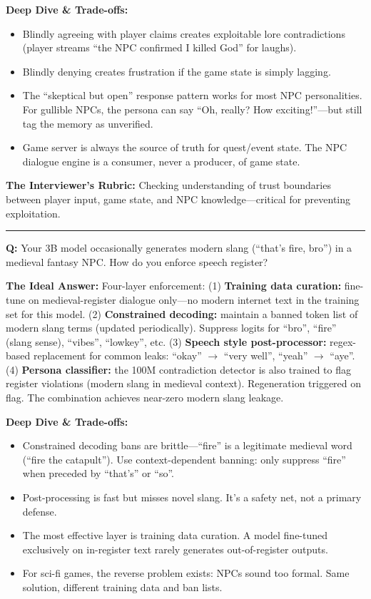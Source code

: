 \textbf{Deep Dive \& Trade-offs:}
\begin{itemize}
  \item Blindly agreeing with player claims creates exploitable lore contradictions (player streams ``the NPC confirmed I killed God'' for laughs).
  \item Blindly denying creates frustration if the game state is simply lagging.
  \item The ``skeptical but open'' response pattern works for most NPC personalities. For gullible NPCs, the persona can say ``Oh, really? How exciting!''---but still tag the memory as unverified.
  \item Game server is always the source of truth for quest/event state. The NPC dialogue engine is a consumer, never a producer, of game state.
\end{itemize}

\textbf{The Interviewer's Rubric:} Checking understanding of trust boundaries between player input, game state, and NPC knowledge---critical for preventing exploitation.

\bigskip\hrule\bigskip

\textbf{Q:} Your 3B model occasionally generates modern slang (``that's fire, bro'') in a medieval fantasy NPC. How do you enforce speech register?

\textbf{The Ideal Answer:} Four-layer enforcement: (1) \textbf{Training data curation:} fine-tune on medieval-register dialogue only---no modern internet text in the training set for this model. (2) \textbf{Constrained decoding:} maintain a banned token list of modern slang terms (updated periodically). Suppress logits for ``bro'', ``fire'' (slang sense), ``vibes'', ``lowkey'', etc. (3) \textbf{Speech style post-processor:} regex-based replacement for common leaks: ``okay'' $\rightarrow$ ``very well'', ``yeah'' $\rightarrow$ ``aye''. (4) \textbf{Persona classifier:} the 100M contradiction detector is also trained to flag register violations (modern slang in medieval context). Regeneration triggered on flag. The combination achieves near-zero modern slang leakage.

\textbf{Deep Dive \& Trade-offs:}
\begin{itemize}
  \item Constrained decoding bans are brittle---``fire'' is a legitimate medieval word (``fire the catapult''). Use context-dependent banning: only suppress ``fire'' when preceded by ``that's'' or ``so''.
  \item Post-processing is fast but misses novel slang. It's a safety net, not a primary defense.
  \item The most effective layer is training data curation. A model fine-tuned exclusively on in-register text rarely generates out-of-register outputs.
  \item For sci-fi games, the reverse problem exists: NPCs sound too formal. Same solution, different training data and ban lists.
\end{itemize}

